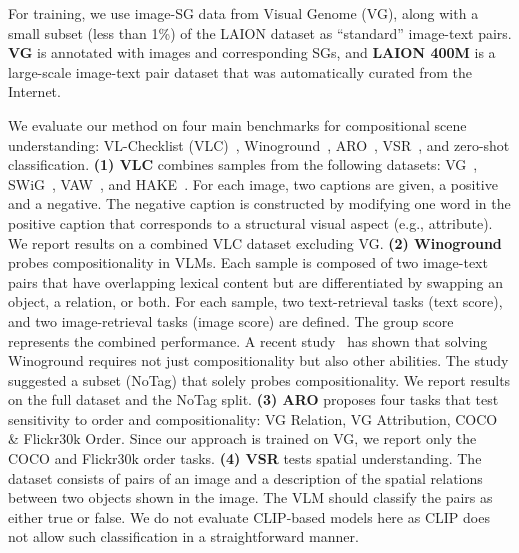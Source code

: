 \documentclass[11pt]{article}
\newcommand{\minisection}[1]{\noindent{\textbf{#1}.}}
\begin{document}
\minisection{Training} For training, we use image-SG data from Visual Genome (VG), along with a small subset (less than 1\%) of the LAION dataset as ``standard'' image-text pairs. \textbf{VG} is annotated with  images and corresponding SGs, and \textbf{LAION 400M} is a large-scale image-text pair dataset that was automatically curated from the Internet. 












\minisection{Evaluation} We evaluate our method on four main benchmarks for compositional scene understanding: VL-Checklist (VLC)~\cite{vlc}, Winoground~\cite{winoground}, ARO~\cite{yuksekgonul2023when}, VSR~\cite{Liu2022VisualSR}, and zero-shot classification. \textbf{(1) VLC} combines samples from the following datasets: VG~\cite{krishna2017visual}, SWiG~\cite{swig}, VAW~\cite{vaw}, and HAKE~\cite{hake}. For each image, two captions are given, a positive and a negative. The negative caption is constructed by modifying one word in the positive caption that corresponds to a structural visual aspect (e.g., attribute). We report results on a combined VLC dataset excluding VG. \textbf{(2) Winoground} probes compositionality in VLMs. 
Each sample is composed of two image-text pairs that have overlapping lexical content but are differentiated by swapping an object, a relation, or both. For each sample, two text-retrieval tasks (text score), and two image-retrieval tasks (image score) are defined. The group score represents the combined performance. A recent study~\cite{Diwan2022WhyIW} has shown that solving  Winoground requires not just compositionality but also other abilities. The study suggested a subset (NoTag) that solely probes compositionality. We report results on the full dataset and the NoTag split. \textbf{(3) ARO} 
proposes four tasks that test sensitivity to order and compositionality: VG Relation, VG Attribution, COCO \& Flickr30k Order. Since our approach is trained on VG, we report only the COCO and Flickr30k order tasks.
\textbf{(4) VSR} tests spatial understanding. The dataset consists of pairs of an image and a description of the spatial relations between two objects shown in the image. The VLM should classify the pairs as either true or false. We do not evaluate CLIP-based models here as CLIP does not allow such classification in a straightforward manner. 
\end{document}
